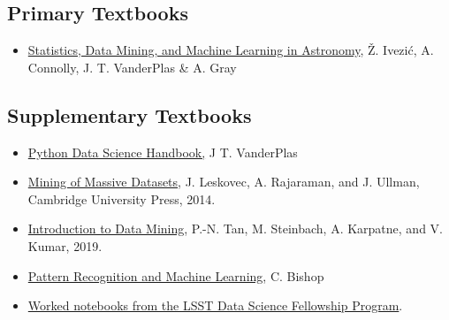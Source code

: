 \documentclass[12pt]{article}
\begin{document}
\subsection*{Primary Textbooks}

\begin{itemize}
\item \href{https://www.oreilly.com/library/view/statistics-data-mining/9780691151687/}{Statistics, Data Mining, and Machine Learning in Astronomy}, Ž. Ivezić, A. Connolly, J. T. VanderPlas \& A. Gray
\end{itemize}

\subsection*{Supplementary Textbooks}

\begin{itemize}
\item \href{https://jakevdp.github.io/PythonDataScienceHandbook/}{Python Data Science Handbook,} J T. VanderPlas
\item \href{http://www.mmds.org/}{Mining of Massive Datasets}, J. Leskovec, A. Rajaraman, and J. Ullman, Cambridge University Press,
2014.
\item \href{https://www-users.cs.umn.edu/~kumar001/dmbook/index.php}{Introduction to Data Mining}, P.-N. Tan, M. Steinbach, A. Karpatne, and V. Kumar, 2019.
\item \href{https://www.microsoft.com/en-us/
research/people/cmbishop/prml-book/}{Pattern Recognition and Machine Learning}, C. Bishop 
\item \href{https://github.com/LSSTC-DSFP/LSSTC-DSFP-Sessions}{Worked notebooks from the LSST Data Science Fellowship Program}.

\end{itemize}

\end{document}
